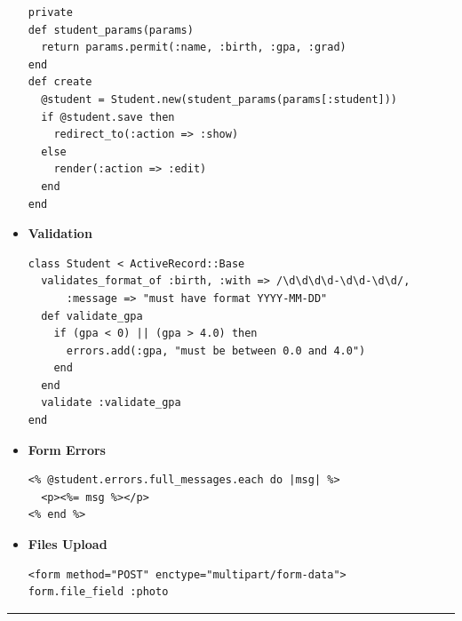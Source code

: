 \documentclass[10pt,landscape]{article}
\begin{document}
\begin{multicols}{2}
\begin{itemize}
\begin{verbatim}
private
def student_params(params)
  return params.permit(:name, :birth, :gpa, :grad)
end
def create
  @student = Student.new(student_params(params[:student]))
  if @student.save then
    redirect_to(:action => :show)
  else
    render(:action => :edit)
  end
end
\end{verbatim}
\item \textbf{Validation}
\begin{verbatim}
class Student < ActiveRecord::Base
  validates_format_of :birth, :with => /\d\d\d\d-\d\d-\d\d/,
      :message => "must have format YYYY-MM-DD"
  def validate_gpa
    if (gpa < 0) || (gpa > 4.0) then
      errors.add(:gpa, "must be between 0.0 and 4.0")
    end
  end
  validate :validate_gpa
end
\end{verbatim}
\item \textbf{Form Errors}
\begin{verbatim}
<% @student.errors.full_messages.each do |msg| %>
  <p><%= msg %></p>
<% end %>
\end{verbatim}
\item \textbf{Files Upload}
\begin{verbatim}
<form method="POST" enctype="multipart/form-data">
form.file_field :photo
\end{verbatim}
\end{itemize}
\rule{0.3\linewidth}{0.25pt}
\scriptsize


\end{multicols}
\end{document}
